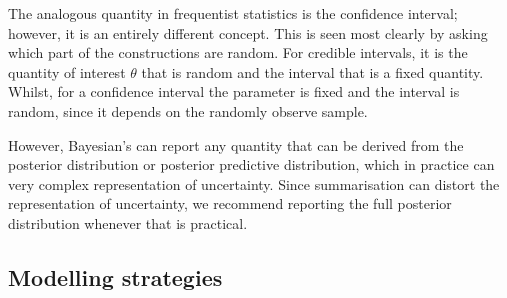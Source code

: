 \documentclass[12pt,english]{article}
\begin{document}
The analogous quantity in frequentist statistics is the confidence interval; however, it is an entirely different concept. This is seen most clearly by asking which part of the constructions are random. For credible intervals, it is the quantity of interest $\theta$ that is random and the interval that is a fixed quantity. Whilst, for a confidence interval the parameter is fixed and the interval is random, since it depends on the randomly observe sample. 

However, Bayesian's can report any quantity that can be derived from the posterior distribution or posterior predictive distribution, which in practice can very complex representation of uncertainty. Since summarisation can distort the representation of uncertainty, we recommend reporting the full posterior distribution whenever that is practical.    


\subsection{Modelling strategies}
\end{document}
